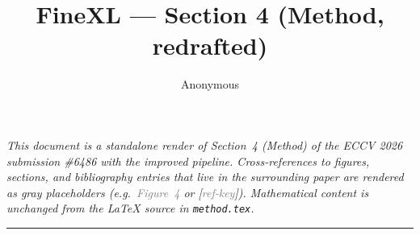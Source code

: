 \documentclass[10pt,a4paper]{article}
\title{FineXL --- Section 4 (Method, redrafted)}
\author{Anonymous}
\date{}
\renewcommand{\cite}[1]{[\textcolor{gray}{\small #1}]}
\newcommand{\stubref}[1]{\textcolor{gray}{\small\textsf{#1}}}
\begin{document}
\maketitle

\noindent\emph{This document is a standalone render of Section~4
(\emph{Method}) of the ECCV 2026 submission \#6486 with the improved
pipeline. Cross-references to figures, sections, and bibliography entries
that live in the surrounding paper are rendered as gray placeholders
(e.g.\ \stubref{Figure~4} or \cite{ref-key}). Mathematical content is
unchanged from the LaTeX source in \texttt{method.tex}.}

\bigskip\hrule\bigskip


\end{document}
